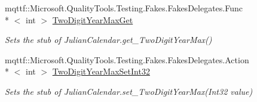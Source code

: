 \begin{DoxyCompactItemize}
mqttf\-::\-Microsoft.\-Quality\-Tools.\-Testing.\-Fakes.\-Fakes\-Delegates.\-Func\\*
$<$ int $>$ \hyperlink{class_system_1_1_globalization_1_1_fakes_1_1_stub_julian_calendar_a9a679a9e4d39b1f805e42495c8d98612}{Two\-Digit\-Year\-Max\-Get}
\begin{DoxyCompactList}\small\item\em Sets the stub of Julian\-Calendar.\-get\-\_\-\-Two\-Digit\-Year\-Max()\end{DoxyCompactList}\item 
mqttf\-::\-Microsoft.\-Quality\-Tools.\-Testing.\-Fakes.\-Fakes\-Delegates.\-Action\\*
$<$ int $>$ \hyperlink{class_system_1_1_globalization_1_1_fakes_1_1_stub_julian_calendar_a90461a547e45081957d2858212ae7fd1}{Two\-Digit\-Year\-Max\-Set\-Int32}
\begin{DoxyCompactList}\small\item\em Sets the stub of Julian\-Calendar.\-set\-\_\-\-Two\-Digit\-Year\-Max(\-Int32 value)\end{DoxyCompactList}\end{DoxyCompactItemize}
